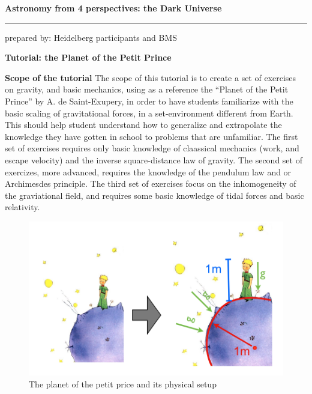 \documentclass[a4paper,12pt]{article}
\newcommand{\HRule}{\rule{\linewidth}{0.3mm}}
\begin{document}
\pagestyle{empty}

\begin{center}
\LARGE \textbf{Astronomy from 4 perspectives: the Dark Universe}
\HRule
\end{center}
\begin{flushright}
prepared by: Heidelberg participants and BMS
\end{flushright}
\begin{center}
{\Large \textbf{Tutorial: the Planet of the Petit Prince}}
\end{center}
\vspace{5mm}
{\bf Scope of the tutorial}
The scope of this tutorial is to create a set of exercises on
gravity, and basic mechanics, using as a reference the ``Planet of the
Petit Prince'' by A. de Saint-Exupery, in order to have students
familiarize with the basic scaling of gravitational forces, in a
set-environment different from Earth. This should help student
understand how to generalize and extrapolate the knowledge they have
gotten in school to problems that are unfamiliar. The first set of
exercises requires only basic knowledge of claassical mechanics (work,
and escape velocity) and the inverse square-distance law of
gravity. The second set of exercizes, more advanced, requires the
knowledge of the pendulum law and or Archimesdes principle. The third
set of exercises focus on the inhomogeneity of the graviational field,
and requires some basic knowledge of tidal forces and basic
relativity.

\begin{figure}[h]
\includegraphics[width=16cm]{figure.png}
\caption{The planet of the petit price and its physical setup}
\end{figure}
\end{document}
